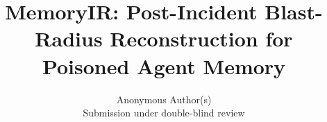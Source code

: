 \documentclass[conference]{IEEEtran}
\title{MemoryIR: Post-Incident Blast-Radius Reconstruction for Poisoned Agent Memory}
\author{Anonymous Author(s)\\Submission under double-blind review}
\begin{document}
\maketitle

\begin{abstract}

\end{abstract}
















\onecolumn

\twocolumn
\end{document}
